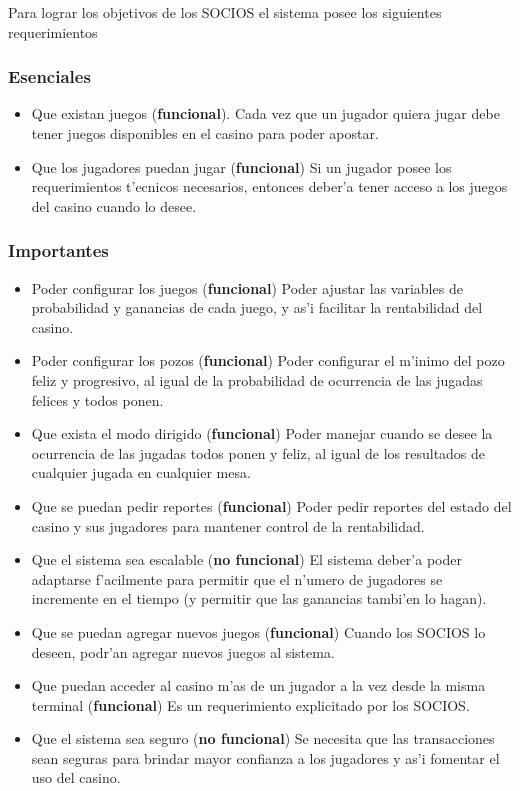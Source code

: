 Para lograr los objetivos de los SOCIOS el sistema posee los siguientes requerimientos

\subsubsection{Esenciales}
\begin{itemize}
    \item Que existan juegos (\textbf{funcional}). Cada vez que un jugador quiera jugar debe tener juegos disponibles en el casino para poder apostar.
    \item Que los jugadores puedan jugar (\textbf{funcional}) Si un jugador posee los requerimientos t'ecnicos necesarios, entonces deber'a tener acceso a los juegos del casino cuando lo desee.
\end{itemize}


\subsubsection{Importantes}
\begin{itemize}
    \item Poder configurar los juegos (\textbf{funcional}) Poder ajustar las variables de probabilidad y ganancias de cada juego, y as'i facilitar la rentabilidad del casino.
    \item Poder configurar los pozos (\textbf{funcional}) Poder configurar el m'inimo del pozo feliz y progresivo, al igual de la probabilidad de ocurrencia de las jugadas felices y todos ponen.
    \item Que exista el modo dirigido (\textbf{funcional}) Poder manejar cuando se desee la ocurrencia de las jugadas todos ponen y feliz, al igual de los resultados de cualquier jugada en cualquier mesa.
    \item Que se puedan pedir reportes (\textbf{funcional}) Poder pedir reportes del estado del casino y sus jugadores para mantener control de la rentabilidad.
    \item Que el sistema sea escalable (\textbf{no funcional}) El sistema deber'a poder adaptarse f'acilmente para permitir que el n'umero de jugadores se incremente en el tiempo (y permitir que las ganancias tambi'en lo hagan).
    \item Que se puedan agregar nuevos juegos (\textbf{funcional}) Cuando los SOCIOS lo deseen, podr'an agregar nuevos juegos al sistema.
    \item Que puedan acceder al casino m'as de un jugador a la vez desde la misma terminal (\textbf{funcional}) Es un requerimiento explicitado por los SOCIOS.
    \item Que el sistema sea seguro (\textbf{no funcional}) Se necesita que las transacciones sean seguras para brindar mayor confianza a los jugadores y as'i fomentar el uso del casino.
\end{itemize}

